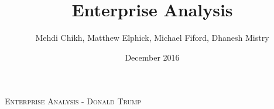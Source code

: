 \documentclass{article}
\title{Enterprise Analysis}
\author{Mehdi Chikh, Matthew Elphick, Michael Fiford, Dhanesh Mistry}
\date{December 2016}
\begin{document}



\begin{spacing}{2}
    \begin{center}
        \textsc{\huge{Enterprise Analysis - Donald Trump}}
    \end{center}
\end{spacing}






\newpage
\printbibliography[heading=bibintoc]
\end{document}
